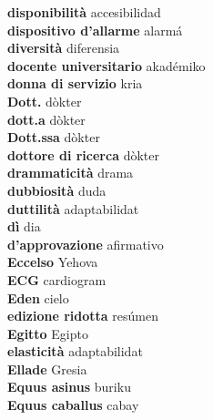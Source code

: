 \textbf{ disponibilità  } accesibilidad \\
\textbf{ dispositivo d’allarme  } alarmá \\
\textbf{ diversità  } diferensia \\
\textbf{ docente universitario  } akadémiko \\
\textbf{ donna di servizio  } kria \\
\textbf{ Dott.  } dòkter \\
\textbf{ dott.a  } dòkter \\
\textbf{ Dott.ssa  } dòkter \\
\textbf{ dottore di ricerca  } dòkter \\
\textbf{ drammaticità  } drama \\
\textbf{ dubbiosità  } duda \\
\textbf{ duttilità  } adaptabilidat \\
\textbf{ dì  } dia \\
\textbf{ d’approvazione  } afirmativo \\
\textbf{ Eccelso  } Yehova \\
\textbf{ ECG  } cardiogram \\
\textbf{ Eden  } cielo \\
\textbf{ edizione ridotta  } resúmen \\
\textbf{ Egitto  } Egipto \\
\textbf{ elasticità  } adaptabilidat \\
\textbf{ Ellade  } Gresia \\
\textbf{ Equus asinus  } buriku \\
\textbf{ Equus caballus  } cabay \\
